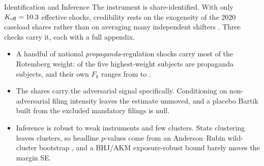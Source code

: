 
\begin{frame}{Identification and Inference}
\hypertarget{src:identbrief}{}
\small
The instrument is share-identified. With only $K_{\text{eff}}=10.3$ effective shocks, credibility rests on the exogeneity of the 2020 caseload shares rather than on averaging many independent shifters \citep{goldsmith2020,borusyak2022}. Three checks carry it, each with a full appendix.
\medskip
\begin{itemize}\itemsep4pt
  \item A handful of national \emph{propaganda}-regulation shocks carry most of the Rotemberg weight: \RotPropTopFive{} of the five highest-weight subjects are propaganda subjects, and their own $F_k$ ranges from \RotFMin{} to \RotFMax{}. \hfill\hyperlink{app:rotemberg}{}
  \item The shares carry the adversarial signal specifically. Conditioning on non-adversarial filing intensity leaves the estimate unmoved, and a placebo Bartik built from the excluded mandatory filings is null. \hfill\hyperlink{app:shares}{}
  \item Inference is robust to weak instruments and few clusters. State clustering leaves \NClusters{} clusters, so headline $p$-values come from an Anderson--Rubin wild-cluster bootstrap , and a BHJ/AKM exposure-robust bound  barely moves the margin SE. \hfill\hyperlink{app:inference}{}
\end{itemize}
\smallskip
{}
\end{frame}
